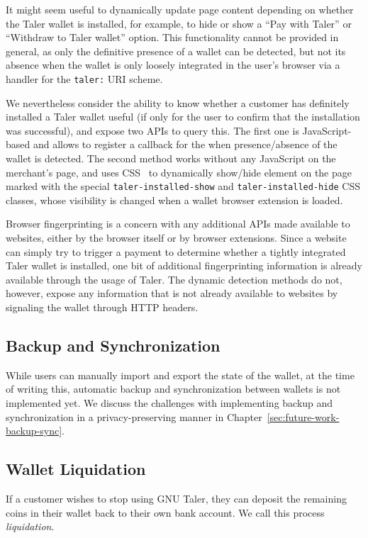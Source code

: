 It might seem useful to dynamically update page content depending on whether
the Taler wallet is installed, for example, to hide or show a ``Pay with Taler''
or ``Withdraw to Taler wallet'' option.  This functionality cannot be provided
in general, as only the definitive presence of a wallet can be detected, but
not its absence when the wallet is only loosely integrated in the user's
browser via a handler for the \texttt{taler:} URI scheme.

We nevertheless consider the ability to know whether a customer has definitely
installed a Taler wallet useful (if only for the user to confirm that the
installation was successful), and expose two APIs to query this.  The first one
is JavaScript-based and allows to register a callback for the when
presence/absence of the wallet is detected.  The second method works without
any JavaScript on the merchant's page, and uses CSS~\cite{sheets1998level} to dynamically show/hide
element on the page marked with the special \texttt{taler-installed-show} and
\texttt{taler-installed-hide} CSS classes, whose visibility is changed when
a wallet browser extension is loaded.

Browser fingerprinting \cite{mulazzani2013fast} is a concern with any
additional APIs made available to websites, either by the browser itself or by
browser extensions.  Since a website can simply try to trigger a payment to
determine whether a tightly integrated Taler wallet is installed, one bit of
additional fingerprinting information is already available through the usage of
Taler.  The dynamic detection methods do not, however, expose any information
that is not already available to websites by signaling the wallet through HTTP
headers.

\subsection{Backup and Synchronization}
While users can manually import and export the state of the wallet, at the time
of writing this, automatic backup and synchronization between wallets is not
implemented yet.  We discuss the challenges with implementing backup and
synchronization in a privacy-preserving manner in
Chapter~\ref{sec:future-work-backup-sync}.


\subsection{Wallet Liquidation}
If a customer wishes to stop using GNU Taler, they can deposit the remaining
coins in their wallet back to their own bank account.  We call this process
\emph{liquidation}.

